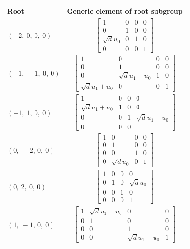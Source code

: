 \documentclass[11pt]{article}
\theoremstyle{definition}
\begin{document}
\noindent \begin{longtable}{|l|c|}
    \hline
    \textbf{Root} & \textbf{Generic element of root subgroup} \\
    \hline
    \endhead
    $\left( -2, \  0, \  0, \  0\right)$ & ${\left[\begin{matrix}1 & 0 & 0 & 0\\0 & 1 & 0 & 0\\\sqrt{d} u_{0} & 0 & 1 & 0\\0 & 0 & 0 & 1\end{matrix}\right]}$ \\
    \hline
    $\left( -1, \  -1, \  0, \  0\right)$ & ${\left[\begin{matrix}1 & 0 & 0 & 0\\0 & 1 & 0 & 0\\0 & \sqrt{d} u_{1} - u_{0} & 1 & 0\\\sqrt{d} u_{1} + u_{0} & 0 & 0 & 1\end{matrix}\right]}$ \\
    \hline
    $\left( -1, \  1, \  0, \  0\right)$ & ${\left[\begin{matrix}1 & 0 & 0 & 0\\\sqrt{d} u_{1} + u_{0} & 1 & 0 & 0\\0 & 0 & 1 & \sqrt{d} u_{1} - u_{0}\\0 & 0 & 0 & 1\end{matrix}\right]}$ \\
    \hline
    $\left( 0, \  -2, \  0, \  0\right)$ & ${\left[\begin{matrix}1 & 0 & 0 & 0\\0 & 1 & 0 & 0\\0 & 0 & 1 & 0\\0 & \sqrt{d} u_{0} & 0 & 1\end{matrix}\right]}$ \\
    \hline
    $\left( 0, \  2, \  0, \  0\right)$ & ${\left[\begin{matrix}1 & 0 & 0 & 0\\0 & 1 & 0 & \sqrt{d} u_{0}\\0 & 0 & 1 & 0\\0 & 0 & 0 & 1\end{matrix}\right]}$ \\
    \hline
    $\left( 1, \  -1, \  0, \  0\right)$ & ${\left[\begin{matrix}1 & \sqrt{d} u_{1} + u_{0} & 0 & 0\\0 & 1 & 0 & 0\\0 & 0 & 1 & 0\\0 & 0 & \sqrt{d} u_{1} - u_{0} & 1\end{matrix}\right]}$ \\

\end{longtable}
\end{document}
